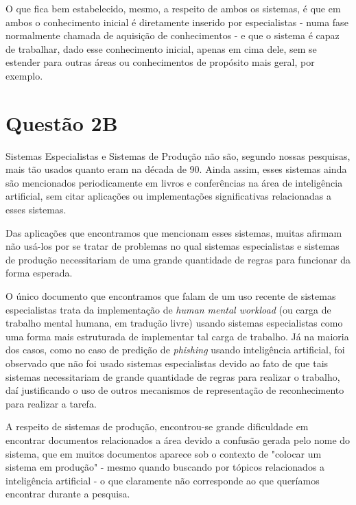 \documentclass{article}
\begin{document}
    O que fica bem estabelecido, mesmo, a respeito de ambos os sistemas, é que
    em ambos o conhecimento inicial é diretamente inserido por especialistas -
    numa fase normalmente chamada de aquisição de conhecimentos - e que o
    sistema é capaz de trabalhar, dado esse conhecimento inicial, apenas em
    cima dele, sem se estender para outras áreas ou conhecimentos de propósito
    mais geral, por exemplo.

\section*{Questão 2B}
    Sistemas Especialistas e Sistemas de Produção não são, segundo nossas
    pesquisas, mais tão usados quanto eram na década de 90. Ainda assim, esses
    sistemas ainda são mencionados periodicamente em livros e conferências na
    área de inteligência artificial, sem citar aplicações ou implementações
    significativas relacionadas a esses sistemas.
    
    Das aplicações que encontramos que mencionam esses sistemas, muitas afirmam
    não usá-los por se tratar de problemas no qual sistemas especialistas e
    sistemas de produção necessitariam de uma grande quantidade de regras para
    funcionar da forma esperada. 
    
    O único documento que encontramos que falam de um uso recente de sistemas
    especialistas trata da implementação de \textit{human mental workload} (ou
    carga de trabalho mental humana, em tradução livre) usando sistemas
    especialistas como uma forma mais estruturada de implementar tal carga de
    trabalho. Já na maioria dos casos, como no caso de predição de
    \textit{phishing} usando inteligência artificial, foi observado que não foi
    usado sistemas especialistas devido ao fato de que tais sistemas
    necessitariam de grande quantidade de regras para realizar o trabalho, daí
    justificando o uso de outros mecanismos de representação de reconhecimento
    para realizar a tarefa.
    
    A respeito de sistemas de produção, encontrou-se grande dificuldade em
    encontrar documentos relacionados a área devido a confusão gerada pelo nome
    do sistema, que em muitos documentos aparece sob o contexto de "colocar um
    sistema em produção" - mesmo quando buscando por tópicos relacionados a
    inteligência artificial - o que claramente não corresponde ao que queríamos
    encontrar durante a pesquisa.
\end{document}
